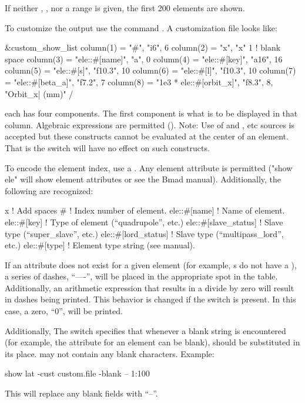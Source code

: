{{{\begin{description}
If neither , , nor a range is given,
the first 200 elements are shown.

To customize the output use the command . A customization file looks like:
\begin{example}
  &custom_show_list
    column(1) = "#",                     "i6",     6 
    column(2) = "x",                     "x"       1       ! blank space
    column(3) = "ele::#[name]",          "a",      0
    column(4) = "ele::#[key]",           "a16",   16
    column(5) = "ele::#[s]",             "f10.3", 10
    column(6) = "ele::#[l]",             "f10.3", 10
    column(7) = "ele::#[beta_a]",        "f7.2",   7
    column(8) = "1e3 * ele::#[orbit_x]", "f8.3",   8, "Orbit_x| (mm)" 
  /
\end{example}
each  has four components. The first component is what
is to be displayed in that column. Algebraic expressions are permitted
(). Note: Use of  and , etc
sources is accepted but these constructs cannot be evaluated at the
center of an element. That is the  switch will have no
effect on such constructs.

To encode the element index, use a \vn{\#}.
Any element attribute is permitted ("show ele" will show element
attributes or see the Bmad manual). Additionally, the following are
recognized:
\begin{example}
  x                          ! Add spaces
  #                          ! Index number of element.
  ele::#[name]                ! Name of element.
  ele::#[key]                 ! Type of element (``quadrupole'', etc.)
  ele::#[slave_status]        ! Slave type (``super_slave'', etc.)
  ele::#[lord_status]         ! Slave type (``multipass_lord'', etc.)
  ele::#[type]                ! Element type string (see \bmad manual).
\end{example}
If an attribute does not exist for a given element (for example,
s do not have a ), a series of dashes,
``----'', will be placed in the appropriate spot in the table.
Additionally, an arithmetic expression that results in a divide by
zero will result in dashes being printed. This behavior is changed if
the  switch is present. In this case, a zero, ``0'', will
be printed. 

Additionally, The  switch specifies
that whenever a blank string is encountered (for example, the
 attribute for an element can be blank),  should
be substituted in its place.  may not contain any blank
characters. Example:
\begin{example}
  show lat -cust custom.file -blank -- 1:100
\end{example}
This will replace any blank fields with ``--''.


\end{description}}}}
